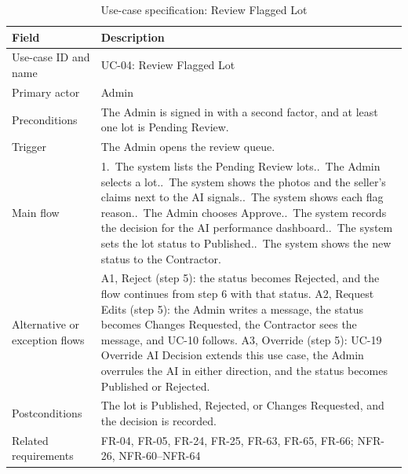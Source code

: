 \begin{table}[H]
\centering
\caption{Use-case specification: Review Flagged Lot}
\label{tab:uc-review-flagged-lot}
\footnotesize
\begin{tabularx}{\textwidth}{@{}p{}X@{}}
\toprule
\textbf{Field} & \textbf{Description} \\
\midrule
Use-case ID and name & UC-04: Review Flagged Lot \\
Primary actor & Admin \\
Preconditions & The Admin is signed in with a second factor, and at least one lot is Pending Review. \\
Trigger & The Admin opens the review queue. \\
Main flow & 1.~The system lists the Pending Review lots.\newline
2.~The Admin selects a lot.\newline
3.~The system shows the photos and the seller's claims next to the AI signals.\newline
4.~The system shows each flag reason.\newline
5.~The Admin chooses Approve.\newline
6.~The system records the decision for the AI performance dashboard.\newline
7.~The system sets the lot status to Published.\newline
8.~The system shows the new status to the Contractor. \\
Alternative or exception flows & A1, Reject (step 5): the status becomes Rejected, and the flow continues from step 6 with that status.\newline
A2, Request Edits (step 5): the Admin writes a message, the status becomes Changes Requested, the Contractor sees the message, and UC-10 follows.\newline
A3, Override (step 5): UC-19 Override AI Decision extends this use case, the Admin overrules the AI in either direction, and the status becomes Published or Rejected. \\
Postconditions & The lot is Published, Rejected, or Changes Requested, and the decision is recorded. \\
Related requirements & FR-04, FR-05, FR-24, FR-25, FR-63, FR-65, FR-66; NFR-26, NFR-60--NFR-64 \\
\bottomrule
\end{tabularx}
\end{table}

